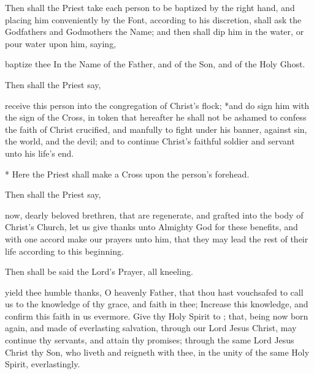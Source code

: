 \begin{rubric}
Then shall the Priest take each person to be baptized by the right hand, and placing him conveniently by the Font, according to his discretion, shall ask the Godfathers and Godmothers the Name; and then shall dip him in the water, or pour water upon him, saying,
\end{rubric}

 baptize thee In the Name of the Father, and of the Son, and of the Holy Ghost.

\begin{rubric}
Then shall the Priest say,
\end{rubric}

 receive this person into the congregation of Christ's flock; *and do sign him with the sign of the Cross, in token that hereafter he shall not be ashamed to confess the faith of Christ crucified, and manfully to fight under his banner, against sin, the world, and the devil; and to continue Christ's faithful soldier and servant unto his life's end.
\begin{secrubric}
* Here the Priest shall make a Cross upon the person's forehead.
\end{secrubric}

\begin{rubric}
Then shall the Priest say,
\end{rubric}

 now, dearly beloved brethren, that  are regenerate, and grafted into the body of Christ's Church, let us give thanks unto Almighty God for these benefits, and with one accord make our prayers unto him, that they may lead the rest of their life according to this beginning.

\newpage

\begin{rubric}
Then shall be said the Lord's Prayer, all kneeling.
\end{rubric}



 yield thee humble thanks, O heavenly Father, that thou hast vouchsafed to call us to the knowledge of thy grace, and faith in thee; Increase this knowledge, and confirm this faith in us evermore.
Give thy Holy Spirit to ; that, being now born again, and made  of everlasting salvation, through our Lord Jesus Christ,  may continue thy servants, and attain thy promises; through the same Lord Jesus Christ thy Son, who liveth and reigneth with thee, in the unity of the same Holy Spirit, everlastingly.

